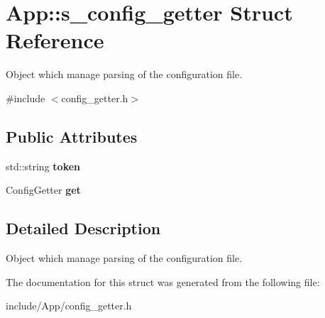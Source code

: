 \section{App\+:\+:s\+\_\+config\+\_\+getter Struct Reference}
\label{struct_app_1_1s__config__getter}


Object which manage parsing of the configuration file.  




{\ttfamily \#include $<$config\+\_\+getter.\+h$>$}

\subsection*{Public Attributes}
\begin{DoxyCompactItemize}
\item 
std\+::string {\bfseries token}\label{struct_app_1_1s__config__getter_a8a49b21359015bf924f84aa250df16a5}

\item 
Config\+Getter {\bfseries get}\label{struct_app_1_1s__config__getter_a0f315890afc418e4992c5b3e5ee1f32a}

\end{DoxyCompactItemize}


\subsection{Detailed Description}
Object which manage parsing of the configuration file. 

The documentation for this struct was generated from the following file\+:\begin{DoxyCompactItemize}
\item 
include/\+App/config\+\_\+getter.\+h\end{DoxyCompactItemize}
